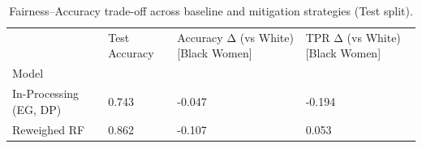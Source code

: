 \begin{table}[htbp]
\centering
\caption{Fairness–Accuracy trade-off across baseline and mitigation strategies (Test split).}
\label{tab:mitigation-effectiveness}
\begin{tabular}{llll}
\toprule
 & Test Accuracy & Accuracy Δ (vs White) [Black Women] & TPR Δ (vs White) [Black Women] \\
Model &  &  &  \\
\midrule
In-Processing (EG, DP) & 0.743 & -0.047 & -0.194 \\
Reweighed RF & 0.862 & -0.107 & 0.053 \\
\bottomrule
\end{tabular}

\end{table}